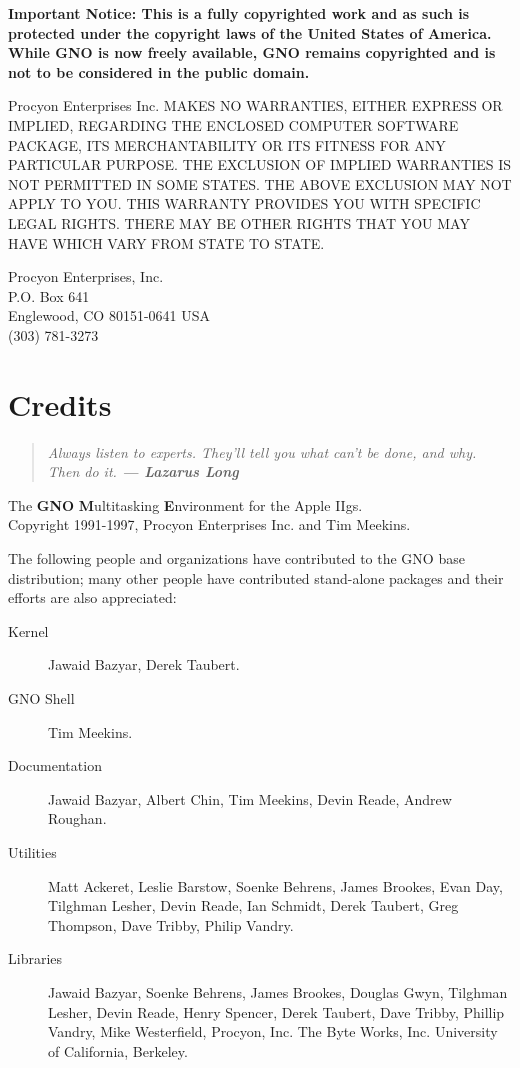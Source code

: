 \documentclass{report}
\begin{document}
\bf
Important Notice:
\rm
This is a fully 
copyrighted work and as such is protected under the copyright
laws of the United States of America.
While GNO is now freely available, GNO remains copyrighted and
is not to be considered in the public domain.

Procyon Enterprises Inc.
MAKES NO
WARRANTIES, EITHER EXPRESS OR IMPLIED, REGARDING THE ENCLOSED
COMPUTER SOFTWARE PACKAGE, ITS MERCHANTABILITY OR ITS FITNESS FOR
ANY PARTICULAR PURPOSE. THE EXCLUSION OF IMPLIED WARRANTIES IS
NOT PERMITTED IN SOME STATES. THE ABOVE EXCLUSION MAY NOT APPLY
TO YOU. THIS WARRANTY PROVIDES YOU WITH SPECIFIC LEGAL RIGHTS.
THERE MAY BE OTHER RIGHTS THAT YOU MAY HAVE WHICH VARY FROM STATE
TO STATE.

Procyon Enterprises, Inc. \\
P.O. Box 641 \\
Englewood, CO 80151-0641 USA \\
(303) 781-3273

\chapter{Credits}

\begin{quote}
\em
Always listen to experts. They'll tell you what can't be done, and why.
Then do it.  \bf --- Lazarus Long \rm
\end{quote}

The {\bf GNO} {\bf M}ultitasking {\bf E}nvironment for the Apple IIgs. \\
Copyright 1991-1997, Procyon Enterprises Inc. and Tim Meekins.

The following people and organizations have contributed to the GNO base
distribution; many other people have contributed stand-alone packages and
their efforts are also appreciated:

\begin{description}

\item[Kernel]
Jawaid Bazyar,
Derek Taubert.

\item[GNO Shell]
Tim Meekins.

\item[Documentation]
Jawaid Bazyar,
Albert Chin,
Tim Meekins, 
Devin Reade,
Andrew Roughan.

\item[Utilities]
Matt Ackeret,
Leslie Barstow,
Soenke Behrens,
James Brookes,
Evan Day,
Tilghman Lesher,
Devin Reade,
Ian Schmidt,
Derek Taubert,
Greg Thompson,
Dave Tribby,
Philip Vandry.

\item[Libraries]
Jawaid Bazyar,
Soenke Behrens,
James Brookes,
Douglas Gwyn,
Tilghman Lesher,
Devin Reade,
Henry Spencer,
Derek Taubert,
Dave Tribby,
Phillip Vandry,
Mike Westerfield,
Procyon, Inc.
The Byte Works, Inc.
University of California, Berkeley.

\end{description}
\end{document}
